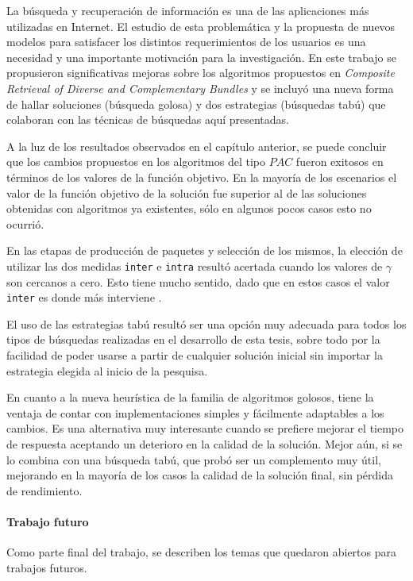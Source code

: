 La búsqueda y recuperación de información es una de las aplicaciones más utilizadas en Internet. El estudio de esta problemática y la propuesta de nuevos modelos para satisfacer los distintos requerimientos de los usuarios es una necesidad y una importante motivación para la investigación. En este trabajo se propusieron significativas mejoras sobre los algoritmos propuestos en {\em Composite Retrieval of Diverse and Complementary Bundles} y se incluyó una nueva forma de hallar soluciones (búsqueda golosa) y dos estrategias (búsquedas tabú) que colaboran con las técnicas de búsquedas aquí presentadas.

A la luz de los resultados observados en el capítulo anterior, se puede concluir que los cambios propuestos en los algoritmos del tipo $PAC$ fueron exitosos en términos de los valores de la función objetivo. En la mayoría de los escenarios el valor de la función objetivo de la solución fue superior al de las soluciones obtenidas con algoritmos ya existentes, sólo en algunos pocos casos esto no ocurrió. 

En las etapas de producción de paquetes y selección de los mismos, la elección de utilizar las dos medidas \texttt{inter} e \texttt{intra} resultó acertada cuando los valores de $\gamma$ son cercanos a cero. Esto tiene mucho sentido, dado que en estos casos el valor \texttt{inter} es donde más interviene .

El uso de las estrategias tabú resultó ser una opción muy adecuada para todos los tipos de búsquedas realizadas en el desarrollo de esta tesis, sobre todo por la facilidad de poder usarse a partir de cualquier solución inicial sin importar la estrategia elegida al inicio de la pesquisa.

En cuanto a la nueva heurística de la familia de algoritmos golosos, tiene la ventaja de contar con implementaciones simples y fácilmente adaptables a los cambios. Es una alternativa muy interesante cuando se prefiere mejorar el tiempo de respuesta aceptando un deterioro en la calidad de la solución. Mejor aún, si se lo combina con una búsqueda tabú, que probó ser un complemento muy útil, mejorando en la mayoría de los casos la calidad de la solución final, sin pérdida de rendimiento. 

\paragraph{Trabajo futuro} Como parte final del trabajo, se describen los temas que quedaron abiertos para trabajos futuros. 

